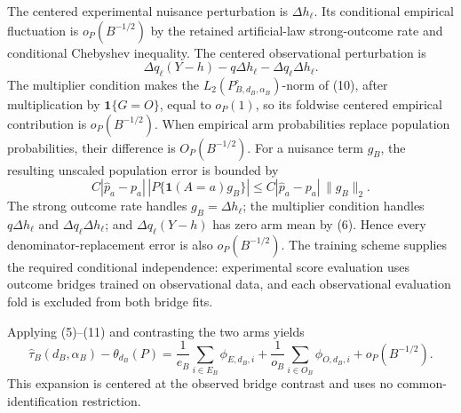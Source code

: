 The centered experimental nuisance perturbation is \(\Delta h_\ell\).  Its conditional empirical fluctuation is \(o_P(B^{-1/2})\) by the retained artificial-law strong-outcome rate and conditional Chebyshev inequality.  The centered observational perturbation is
\[
 \Delta q_\ell(Y-h)-q\Delta h_\ell-\Delta q_\ell\Delta h_\ell. \tag{10}
\]
The multiplier condition makes the \(L_2(P_{B,d_B,\alpha_B}^{\circ})\)-norm of (10), after multiplication by \(\mathbf1\{G=O\}\), equal to \(o_P(1)\), so its foldwise centered empirical contribution is \(o_P(B^{-1/2})\).  When empirical arm probabilities replace population probabilities, their difference is \(O_P(B^{-1/2})\).  For a nuisance term \(g_B\), the resulting unscaled population error is bounded by
\[
 C|\widehat p_a-p_a|\,|P\{\mathbf1(A=a)g_B\}|
 \le C|\widehat p_a-p_a|\,\|g_B\|_2.                         \tag{11}
\]
The strong outcome rate handles \(g_B=\Delta h_\ell\); the multiplier condition handles \(q\Delta h_\ell\) and \(\Delta q_\ell\Delta h_\ell\); and \(\Delta q_\ell(Y-h)\) has zero arm mean by (6).  Hence every denominator-replacement error is also \(o_P(B^{-1/2})\).  The training scheme supplies the required conditional independence: experimental score evaluation uses outcome bridges trained on observational data, and each observational evaluation fold is excluded from both bridge fits.

Applying (5)--(11) and contrasting the two arms yields
\[
 \widehat\tau_B(d_B,\alpha_B)-\theta_{d_B}(P)
 =\frac1{e_B}\sum_{i\in E_B}\phi_{E,d_B,i}
 +\frac1{o_B}\sum_{i\in O_B}\phi_{O,d_B,i}
 +o_P(B^{-1/2}).                                               \tag{12}
\]
This expansion is centered at the observed bridge contrast and uses no common-identification restriction.

